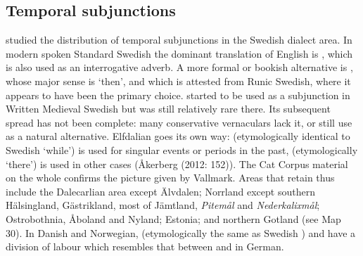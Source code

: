
\subsection{Temporal subjunctions}

\citet{Vallmark1936} studied the distribution of temporal subjunctions in the Swedish dialect area. In modern spoken Standard Swedish the dominant translation of English  is , which is also used as an interrogative adverb. A more formal or bookish alternative is , whose major sense is ‘then’, and which is attested from Runic Swedish, where it appears to have been the primary choice. started to be used as a subjunction in Written Medieval Swedish but was still relatively rare there. Its subsequent spread has not been complete: many conservative vernaculars lack it, or still use as a natural alternative. Elfdalian goes its own way:  (etymologically identical to Swedish  ‘while’) is used for singular events or periods in the past,  (etymologically ‘there’) is used in other cases (Åkerberg (2012: 152)). The Cat Corpus material on the whole confirms the picture given by Vallmark. Areas that retain  thus include the Dalecarlian area except Älvdalen; Norrland except southern Hälsingland, Gästrikland, most of Jämtland, \textit{Pitemål} and \textit{Nederkalixmål}; Ostrobothnia, Åboland and Nyland; Estonia; and northern Gotland (see Map 30). In Danish and Norwegian,  (etymologically the same as Swedish ) and  have a division of labour which resembles that between  and  in German. 




